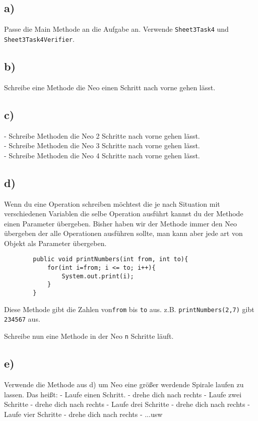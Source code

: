 \subsection*{a)}
	Passe die Main Methode an die Aufgabe an. Verwende \lstinline{Sheet3Task4} und \lstinline{Sheet3Task4Verifier}.
\subsection*{b)}
	Schreibe eine Methode die Neo einen Schritt nach vorne gehen lässt.
\subsection*{c)}
	- Schreibe Methoden die Neo 2 Schritte nach vorne gehen lässt.\\
	- Schreibe Methoden die Neo 3 Schritte nach vorne gehen lässt.\\
	- Schreibe Methoden die Neo 4 Schritte nach vorne gehen lässt.
\subsection*{d)}
	\begin{Infobox}
		Wenn du eine Operation schreiben möchtest die je nach Situation mit verschiedenen Variablen die selbe Operation ausführt kannst du der Methode einen Parameter übergeben. Bisher haben wir der Methode immer den Neo übergeben der alle Operationen ausführen sollte, man kann aber jede art von Objekt als Parameter übergeben.
	
	\begin{lstlisting}
		public void printNumbers(int from, int to){
			for(int i=from; i <= to; i++){
				System.out.print(i);
			}
		}
	\end{lstlisting}
Diese Methode gibt die Zahlen von\lstinline{from} bis \lstinline{to} aus. z.B. \lstinline{printNumbers(2,7)} gibt  \lstinline{234567} aus.
	\end {Infobox}
Schreibe nun eine Methode in der Neo \lstinline{n} Schritte läuft.
\subsection*{e)}
Verwende die Methode aus d) um Neo eine größer werdende Spirale laufen zu lassen. Das heißt:
- Laufe einen Schritt.
- drehe dich nach rechts
- Laufe zwei Schritte
- drehe dich nach rechts
- Laufe drei Schritte
- drehe dich nach rechts
- Laufe vier Schritte
- drehe dich nach rechts
- ...usw
\newpage